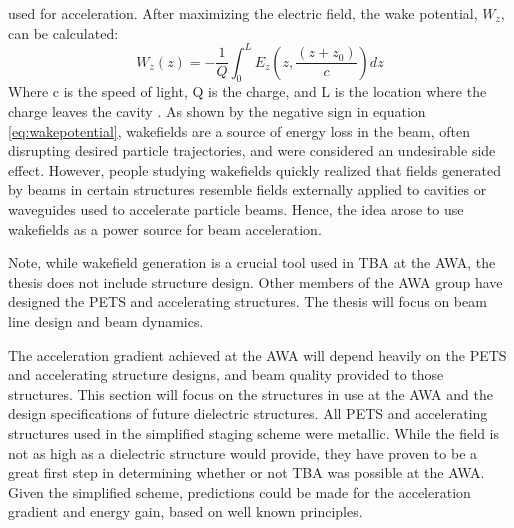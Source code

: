 used for acceleration.   
After maximizing the electric field, the wake potential, $W_z$, can be calculated: 
\begin{equation}
W_z\left(z\right)= -\frac{1}{Q} \int_{0}^{L} E_z \left(z,\frac{\left(z+z_0\right)}{c}\right)dz
\label{eq:wakepotential}
\end{equation} 
Where c is the speed of light, Q is the charge, 
and L is the location where the charge leaves the cavity \cite{SLACwakefields}.
As shown by the negative sign in equation \ref{eq:wakepotential}, wakefields are a source of 
energy loss in the beam, often disrupting desired particle trajectories, 
and were considered an undesirable side effect.
However, people studying wakefields quickly realized that fields
generated by beams in certain structures resemble fields externally 
applied to cavities or waveguides used to accelerate particle beams.
Hence, the idea arose to use wakefields as a power source for beam acceleration. 

Note, while wakefield generation is a crucial tool used in TBA at the AWA, the thesis does not include 
structure design. Other members of the AWA group have designed the PETS and accelerating
structures. The thesis will focus on beam line design and beam dynamics. 



The acceleration gradient achieved at the AWA will depend heavily 
on the PETS and accelerating structure designs, and beam quality 
provided to those structures. This section will focus on the 
structures in use at the AWA and the design specifications of future 
dielectric structures. All PETS and accelerating structures 
used in the simplified staging scheme were metallic. 
While the field is not as high as a dielectric structure would provide,
they have proven to be a great first step 
in determining whether or not TBA was possible at the AWA. Given 
the simplified scheme, predictions could be made for the acceleration 
gradient and energy gain, based on well known principles. 

